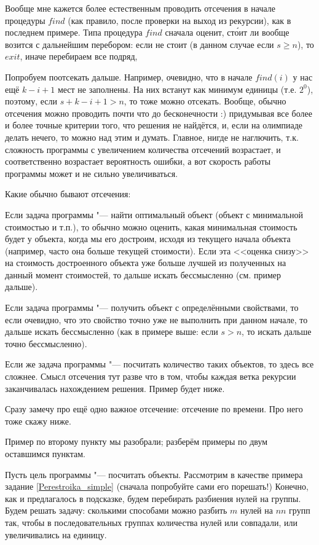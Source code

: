 Вообще мне кажется более естественным проводить отсечения в начале процедуры $find$ (как правило, после проверки на выход из рекурсии), как в последнем примере. Типа процедура $find$
сначала оценит, ст\'{о}ит ли вообще возится с дальнейшим перебором: если не стоит
(в данном случае если $s\geq n$), то $exit$, иначе перебираем все подряд,

Попробуем поотсекать дальше. Например, очевидно, что в начале $find(i)$ у нас ещё $k-i+1$ мест не 
заполнены. На них встанут как минимум единицы (т.е. $2^0$), поэтому, если $s+k-i+1>n$, то тоже можно 
отсекать. Вообще, обычно отсечения можно проводить почти что до бесконечности :) придумывая 
все более и более точные критерии того, что решения не найдётся, и, если на
олимпиаде делать нечего, то можно над этим и думать. Главное, нигде не
наглючить, т.к. сложность программы с увеличением количества отсечений
возрастает, и соответственно возрастает вероятность ошибки, а вот скорость работы программы может и не сильно увеличиваться.

Какие обычно бывают отсечения:
\begin{ulist}
\item Если задача программы "--- найти оптимальный объект (объект с минимальной стоимостью и т.п.), то обычно можно оценить, какая минимальная стоимость будет у объекта, когда мы его достроим, исходя из текущего начала объекта (например, часто она больше текущей стоимости). Если эта <<оценка снизу>> на стоимость достроенного объекта уже больше лучшей из полученных на данный момент стоимостей, то дальше искать бессмысленно (см. пример дальше).
\item Если задача программы "--- получить объект с определёнными свойствами, то если очевидно, что это свойство точно уже не выполнить при данном начале, то дальше искать бессмысленно (как в примере выше: если $s>n$, то искать дальше точно бессмысленно).
\item Если же задача программы "--- посчитать количество таких объектов, то здесь все сложнее. Смысл отсечения тут разве что в том, чтобы каждая ветка рекурсии заканчивалась нахождением решения. Пример будет ниже.
\item Сразу замечу про ещё одно важное отсечение: отсечение по времени. Про него тоже скажу ниже.
\end{ulist}

Пример по второму пункту мы разобрали; разберём примеры по двум оставшимся пунктам.

\label{Perestroika_adv}
Пусть цель программы "--- посчитать объекты. Рассмотрим в качестве примера задание \ref{Perestroika_simple} (сначала попробуйте сами его порешать!)
Конечно, как и предлагалось в подсказке, будем перебирать разбиения
нулей на группы. Будем решать задачу: сколькими способами можно разбить $m$ нулей на $nn$ групп так, чтобы в последовательных группах количества нулей или совпадали, или увеличивались на единицу.

